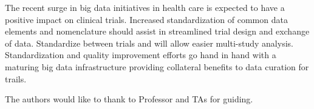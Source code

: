 \documentclass[sigconf]{acmart}
\begin{document}
The recent surge in big data initiatives in health care is expected to have a positive impact on clinical trials. Increased standardization of common data elements and nomenclature should assist in streamlined trial design and exchange of data. Standardize between trials and will allow easier multi-study analysis. Standardization and quality improvement efforts go hand in hand with a maturing big data infrastructure providing collateral benefits to data curation for trails.

\begin{acks}

  The authors would like to thank to Professor and TAs for guiding.

\end{acks}


 
\end{document}
